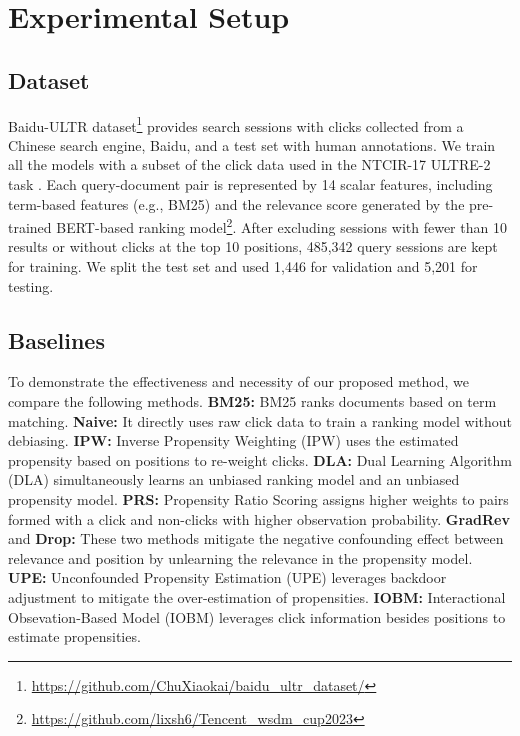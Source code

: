 \section{Experimental Setup}
\subsection{Dataset}
Baidu-ULTR dataset\footnote{\url{https://github.com/ChuXiaokai/baidu_ultr_dataset/}} provides search sessions with clicks collected from a Chinese search engine, Baidu, and a test set with human annotations. We train all the models with a subset of the click data used in the NTCIR-17 ULTRE-2 task \cite{niu2023overview}. Each query-document pair is represented by 14 scalar features, including term-based features (e.g., BM25) and the relevance score generated by the pre-trained BERT-based ranking model\footnote{\url{https://github.com/lixsh6/Tencent_wsdm_cup2023}}. After excluding sessions with fewer than 10 results or without clicks at the top 10 positions, 485,342 query sessions are kept for training. We split the test set and used 1,446 for validation and 5,201 for testing.
\subsection{Baselines}
To demonstrate the effectiveness and necessity of our proposed method, we compare the following methods. \textbf{BM25:} BM25 \cite{robertson1994some} ranks documents based on term matching. \textbf{Naive:} It directly uses raw click data to train a ranking model without debiasing. \textbf{IPW:} Inverse Propensity Weighting (IPW) \cite{joachims2017unbiased} uses the estimated propensity based on positions to re-weight clicks. \textbf{DLA:} Dual Learning Algorithm (DLA) \cite{ai2018unbiased} simultaneously learns an unbiased ranking model and an unbiased propensity model. \textbf{PRS:} Propensity Ratio Scoring \cite{wang2021non} assigns higher weights to pairs formed with a click and non-clicks with higher observation probability. \textbf{GradRev} and \textbf{Drop:} These two methods \cite{zhang2023towards} mitigate the negative confounding effect between relevance and position by unlearning the relevance in the propensity model. \textbf{UPE:} Unconfounded Propensity Estimation (UPE) \cite{luo2024unbiased} leverages backdoor adjustment to mitigate the over-estimation of propensities. \textbf{IOBM:} Interactional Obsevation-Based Model (IOBM) \cite{chen2021adapting} leverages click information besides positions to estimate propensities.

